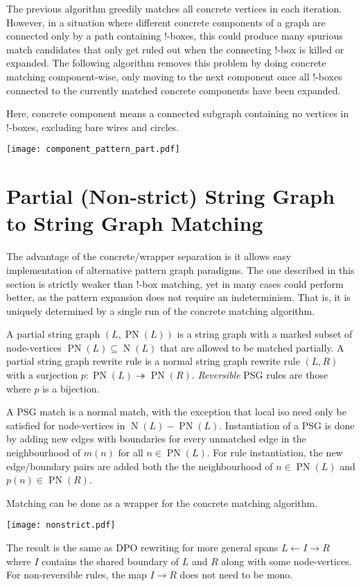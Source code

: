 \documentclass{article}
\DeclareMathOperator{\N}{N}
\DeclareMathOperator{\PN}{PN}
\begin{document}
The previous algorithm greedily matches all concrete vertices in each iteration. However, in a situation where different concrete components of a graph are connected only by a path containing !-boxes, this could produce many spurious match candidates that only get ruled out when the connecting !-box is killed or expanded. The following algorithm removes this problem by doing concrete matching component-wise, only moving to the next component once all !-boxes connected to the currently matched concrete components have been expanded.

Here, concrete component means a connected subgraph containing no vertices in !-boxes, excluding bare wires and circles.

\begin{center}
  \texttt{[image: component\_pattern\_part.pdf]}
\end{center}

\section{Partial (Non-strict) String Graph to String Graph Matching}

The advantage of the concrete/wrapper separation is it allows easy implementation of alternative pattern graph paradigms. The one described in this section is strictly weaker than $!$-box matching, yet in many cases could perform better, as the pattern expansion does not require an indeterminism. That is, it is uniquely determined by a single run of the concrete matching algorithm.

A partial string graph $(L, \PN(L))$ is a string graph with a marked subset of node-vertices $\PN(L) \subseteq \N(L)$ that are allowed to be matched partially. A partial string graph rewrite rule is a normal string graph rewrite rule $(L,R)$ with a surjection $p: \PN(L) \twoheadrightarrow \PN(R)$. \textit{Reversible} PSG rules are those where $p$ is a bijection.

A PSG match is a normal match, with the exception that local iso need only be satisfied for node-vertices in $\N(L) - \PN(L)$. Instantiation of a PSG is done by adding new edges with boundaries for every unmatched edge in the neighbourhood of $m(n)$ for all $n \in \PN(L)$. For rule instantiation, the new edge/boundary pairs are added both the the neighbourhood of $n \in \PN(L)$ and $p(n) \in \PN(R)$.

Matching can be done as a wrapper for the concrete matching algorithm.

\begin{center}
  \texttt{[image: nonstrict.pdf]}
\end{center}

The result is the same as DPO rewriting for more general spans $L \leftarrow I \rightarrow R$ where $I$ contains the shared boundary of $L$ and $R$ along with some node-vertices. For non-reversible rules, the map $I \rightarrow R$ does not need to be mono.
\end{document}

